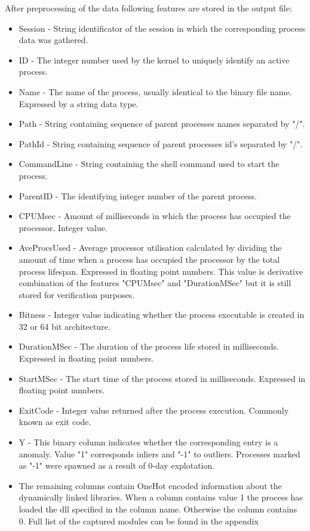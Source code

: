 \documentclass[a4paper,twoside,12pt]{book}
\begin{document}
After preprocessing of the data following features are stored in the output file:
\begin{itemize}
	\item Session - String identificator of the session in which the corresponding process data 
	was gathered.
	\item ID -  The integer number used by the kernel to uniquely identify an active process.
	\item Name -  The name of the process, usually identical to the binary file name. Expressed by a 
	string data type.
	\item Path - String containing sequence of parent processes names separated by "/".
	\item PathId - String containing sequence of parent processes id's separated by "/".
	\item CommandLine - String containing the shell command used to start the process.
	\item ParentID - The identifying integer number of the parent process. 
	\item CPUMsec - Amount of milliseconds in which the process has occupied the processor. Integer value.
	\item AveProcsUsed -  Average processor utilisation calculated by dividing the amount of time 
	when a process has occupied the processor by the total process lifespan. Expressed in floating 
	point numbers. This value is derivative combination of the features "CPUMsec" and "DurationMSec"
	but it is still stored for verification purposes.
	\item Bitness - Integer value indicating whether the process executable is created in 
	32 or 64 bit architecture.
	\item DurationMSec - The duration of the process life stored in milliseconds. Expressed in 
	floating point numbers.
	\item StartMSec -  The start time of the process stored in milliseconds. Expressed in floating 
	point numbers.
	\item ExitCode - Integer value returned after the process execution. Commonly known as exit code.
	\item Y - This binary column indicates whether the corresponding entry is a anomaly. Value "1" corresponds
	inliers and "-1" to outliers. Processes marked as "-1" were spawned as a result of 0-day explotation.
	\item The remaining columns contain OneHot encoded information about the dynamically linked 
	libraries. When a column contains value 1 the process has loaded the dll specified in the 
	column name. Otherwise the column contains 0. Full list of the captured modules can be 
	found in the appendix %
\end{itemize}
\end{document}
